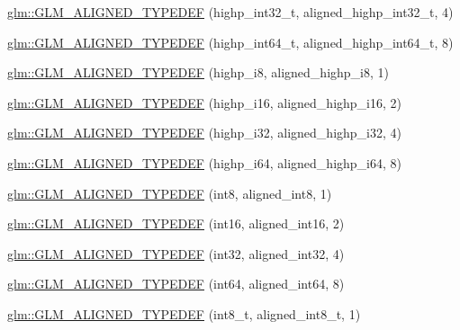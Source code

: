 \begin{DoxyCompactItemize}
\item 
\hyperlink{group__gtx__type__aligned_gaae773c28e6390c6aa76f5b678b7098a3}{glm\-::\-G\-L\-M\-\_\-\-A\-L\-I\-G\-N\-E\-D\-\_\-\-T\-Y\-P\-E\-D\-E\-F} (highp\-\_\-int32\-\_\-t, aligned\-\_\-highp\-\_\-int32\-\_\-t, 4)
\item 
\hyperlink{group__gtx__type__aligned_ga790cfff1ca39d0ed696ffed980809311}{glm\-::\-G\-L\-M\-\_\-\-A\-L\-I\-G\-N\-E\-D\-\_\-\-T\-Y\-P\-E\-D\-E\-F} (highp\-\_\-int64\-\_\-t, aligned\-\_\-highp\-\_\-int64\-\_\-t, 8)
\item 
\hyperlink{group__gtx__type__aligned_ga8265b91eb23c120a9b0c3e381bc37b96}{glm\-::\-G\-L\-M\-\_\-\-A\-L\-I\-G\-N\-E\-D\-\_\-\-T\-Y\-P\-E\-D\-E\-F} (highp\-\_\-i8, aligned\-\_\-highp\-\_\-i8, 1)
\item 
\hyperlink{group__gtx__type__aligned_gae6d384de17588d8edb894fbe06e0d410}{glm\-::\-G\-L\-M\-\_\-\-A\-L\-I\-G\-N\-E\-D\-\_\-\-T\-Y\-P\-E\-D\-E\-F} (highp\-\_\-i16, aligned\-\_\-highp\-\_\-i16, 2)
\item 
\hyperlink{group__gtx__type__aligned_ga9c8172b745ee03fc5b2b91c350c2922f}{glm\-::\-G\-L\-M\-\_\-\-A\-L\-I\-G\-N\-E\-D\-\_\-\-T\-Y\-P\-E\-D\-E\-F} (highp\-\_\-i32, aligned\-\_\-highp\-\_\-i32, 4)
\item 
\hyperlink{group__gtx__type__aligned_ga77e0dff12aa4020ddc3f8cabbea7b2e6}{glm\-::\-G\-L\-M\-\_\-\-A\-L\-I\-G\-N\-E\-D\-\_\-\-T\-Y\-P\-E\-D\-E\-F} (highp\-\_\-i64, aligned\-\_\-highp\-\_\-i64, 8)
\item 
\hyperlink{group__gtx__type__aligned_gabd82b9faa9d4d618dbbe0fc8a1efee63}{glm\-::\-G\-L\-M\-\_\-\-A\-L\-I\-G\-N\-E\-D\-\_\-\-T\-Y\-P\-E\-D\-E\-F} (int8, aligned\-\_\-int8, 1)
\item 
\hyperlink{group__gtx__type__aligned_ga285649744560be21000cfd81bbb5d507}{glm\-::\-G\-L\-M\-\_\-\-A\-L\-I\-G\-N\-E\-D\-\_\-\-T\-Y\-P\-E\-D\-E\-F} (int16, aligned\-\_\-int16, 2)
\item 
\hyperlink{group__gtx__type__aligned_ga07732da630b2deda428ce95c0ecaf3ff}{glm\-::\-G\-L\-M\-\_\-\-A\-L\-I\-G\-N\-E\-D\-\_\-\-T\-Y\-P\-E\-D\-E\-F} (int32, aligned\-\_\-int32, 4)
\item 
\hyperlink{group__gtx__type__aligned_ga1a8da2a8c51f69c07a2e7f473aa420f4}{glm\-::\-G\-L\-M\-\_\-\-A\-L\-I\-G\-N\-E\-D\-\_\-\-T\-Y\-P\-E\-D\-E\-F} (int64, aligned\-\_\-int64, 8)
\item 
\hyperlink{group__gtx__type__aligned_ga848aedf13e2d9738acf0bb482c590174}{glm\-::\-G\-L\-M\-\_\-\-A\-L\-I\-G\-N\-E\-D\-\_\-\-T\-Y\-P\-E\-D\-E\-F} (int8\-\_\-t, aligned\-\_\-int8\-\_\-t, 1)

\end{DoxyCompactItemize}
